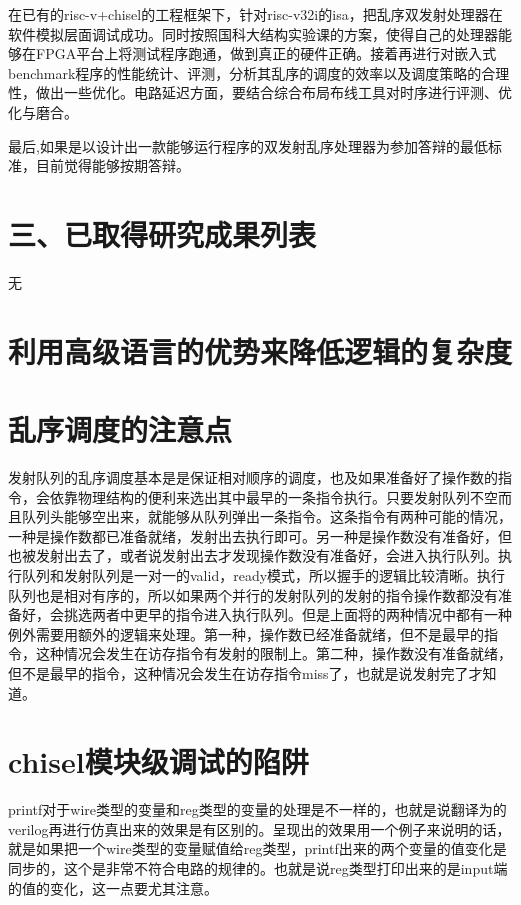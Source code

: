 \documentclass[11pt]{article}
\begin{document}
在已有的risc-v+chisel的工程框架下，针对risc-v32i的isa，把乱序双发射处理器在软件模拟层面调试成功。同时按照国科大结构实验课的方案，使得自己的处理器能够在FPGA平台上将测试程序跑通，做到真正的硬件正确。接着再进行对嵌入式benchmark程序的性能统计、评测，分析其乱序的调度的效率以及调度策略的合理性，做出一些优化。电路延迟方面，要结合综合布局布线工具对时序进行评测、优化与磨合。

最后,如果是以设计出一款能够运行程序的双发射乱序处理器为参加答辩的最低标准，目前觉得能够按期答辩。

\section*{\huge{三、已取得研究成果列表}}
无


\section{利用高级语言的优势来降低逻辑的复杂度}
\section{乱序调度的注意点}
发射队列的乱序调度基本是是保证相对顺序的调度，也及如果准备好了操作数的指令，会依靠物理结构的便利来选出其中最早的一条指令执行。只要发射队列不空而且队列头能够空出来，就能够从队列弹出一条指令。这条指令有两种可能的情况，一种是操作数都已准备就绪，发射出去执行即可。另一种是操作数没有准备好，但也被发射出去了，或者说发射出去才发现操作数没有准备好，会进入执行队列。执行队列和发射队列是一对一的valid，ready模式，所以握手的逻辑比较清晰。执行队列也是相对有序的，所以如果两个并行的发射队列的发射的指令操作数都没有准备好，会挑选两者中更早的指令进入执行队列。但是上面将的两种情况中都有一种例外需要用额外的逻辑来处理。第一种，操作数已经准备就绪，但不是最早的指令，这种情况会发生在访存指令有发射的限制上。第二种，操作数没有准备就绪，但不是最早的指令，这种情况会发生在访存指令miss了，也就是说发射完了才知道。
\section{chisel模块级调试的陷阱}
printf对于wire类型的变量和reg类型的变量的处理是不一样的，也就是说翻译为的verilog再进行仿真出来的效果是有区别的。呈现出的效果用一个例子来说明的话，就是如果把一个wire类型的变量赋值给reg类型，printf出来的两个变量的值变化是同步的，这个是非常不符合电路的规律的。也就是说reg类型打印出来的是input端的值的变化，这一点要尤其注意。
\end{document}
